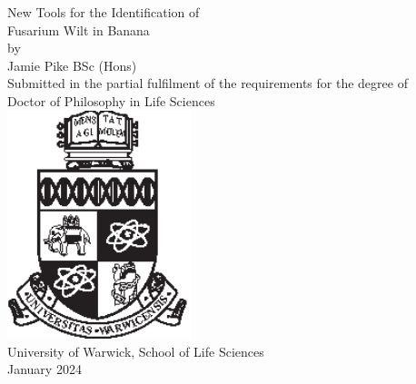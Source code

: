 \begin{titlepage}
    \begin{center}
        \singlespacing
        \Huge
        New Tools for the Identification of \\\vspace*{0.5cm} Fusarium Wilt in Banana \\
        \vspace*{1.75cm}
        \normalsize
        by \\ 
        \vspace*{0.2cm}
        \LARGE
        Jamie Pike BSc (Hons) \\ 
        \large
        \vfill
        \normalsize
        Submitted in the partial fulfilment of the requirements for the degree of \\
        \Large
        \vspace*{0.3cm}
        Doctor of Philosophy in Life Sciences \\
        \vspace*{1cm}
        \includegraphics[width=0.4\textwidth]{PrelimSections/crest_black.eps} \\
        \vspace*{1cm}
        \large
        University of Warwick, School of Life Sciences\\
        \vspace*{0.5cm}
        \normalsize
        January 2024 \\
         \vspace*{1cm}   
    \end{center}
\end{titlepage}